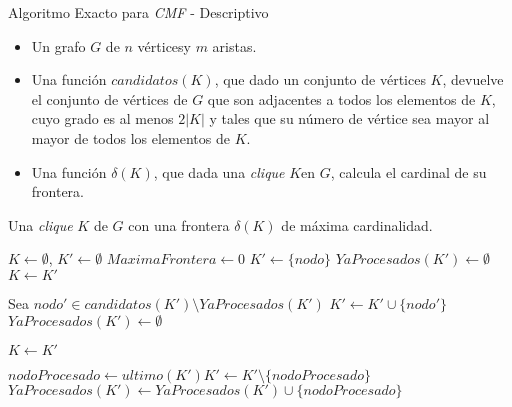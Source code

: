 \renewcommand{\thefootnote}{\alph{footnote}}
\begin{algorithm}[H]
    \caption{Algoritmo Exacto para \emph{CMF} - Descriptivo}
    \begin{algorithmic}[1]
        \Require\Statex
            \begin{itemize}
                \item Un grafo $G$ de $n$ v\'ertices\footnotemark[1] y $m$ aristas.

                \item Una funci\'on $candidatos(K)$, que dado un conjunto de v\'ertices
                    $K$, devuelve el conjunto de v\'ertices de $G$ que son adjacentes
                    a todos los elementos de $K$, cuyo grado es al menos $2|K|$ y tales
                    que su n\'umero de v\'ertice sea mayor al mayor de todos los elementos
                    de $K$.

                \item Una funci\'on $\delta(K)$, que dada una \emph{clique} $K$\footnotemark[2]
                    en $G$, calcula el cardinal de su frontera\footnotemark[3].

            \end{itemize}\Statex
        \Ensure Una \emph{clique} $K$ de $G$ con una frontera 
            $\delta(K)$ de m\'axima cardinalidad.

        \Statex
        \State $K \gets \emptyset$, $K' \gets \emptyset$
        \State $MaximaFrontera \gets 0$
            \State $K' \gets \{nodo\}$
            \State $YaProcesados(K')$\footnotemark[4]$ \gets \emptyset$
                \State $K \gets K'$

                    \State Sea $nodo' \in candidatos(K') \setminus YaProcesados(K')$
                    \State $K' \gets K' \cup \{nodo'\}$
                        \State $YaProcesados(K') \gets \emptyset$ \footnotemark[5]

                        \State $K \gets K'$

                \Else {}
                    \State $nodoProcesado \gets ultimo(K')$\footnotemark[6]
                    \State $K' \gets K' \setminus \{nodoProcesado\}$
                    \State $YaProcesados(K') \gets YaProcesados(K') \cup \{nodoProcesado\}$

                \EndIf

            \EndWhile

        \EndFor

        \State {}
    \end{algorithmic}
\end{algorithm}

